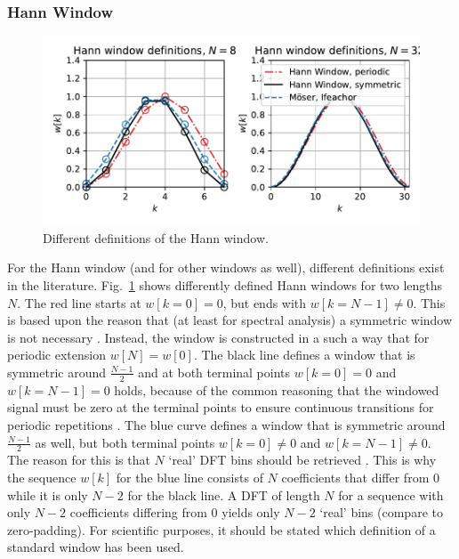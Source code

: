 \documentclass[11pt,a4paper,DIV=12]{scrartcl}
\begin{document}
\subsubsection{Hann Window}
\begin{figure}
		\centering
		\includegraphics[]{graphics/HannDefinitionen.pdf}
		\caption{Different definitions of the Hann window.}
		\label{HannDefinitionen}
\end{figure}

For the Hann window (and for other windows as well), different definitions
exist in the literature.
%
Fig.~\ref{HannDefinitionen} shows differently defined Hann windows for two
lengths $N$.
%
The red line starts at $w[k=0]=0$, but ends with $w[k=N-1]\neq0$.
%
This is based upon the reason that (at least for spectral analysis) a symmetric
window is not necessary \cite[p.~52]{Harris1978}.
%
Instead, the window is constructed in a such a way that for periodic extension
$w[N]=w[0]$.
%
The black line defines a window that is symmetric around $\frac{N-1}{2}$ and at
both terminal points $w[k=0]=0$ and $w[k=N-1]=0$ holds, because of the common
reasoning that the windowed signal must be zero at the terminal points to
ensure continuous transitions for periodic repetitions
\cite{Oppenheim2010, Lyons2011}.
%
The blue curve defines a window that is symmetric around $\frac{N-1}{2}$ as well,
but both terminal points $w[k=0]\neq0$ and $w[k=N-1]\neq0$.
%
The reason for this is that $N$ `real' DFT bins should be retrieved
\cite{Moeser2011, Ifeachor2002}.
%
This is why the sequence $w[k]$ for the blue line consists of $N$ coefficients
that differ from 0 while it is only $N-2$ for the black line.
%
A DFT of length $N$ for a sequence with only $N-2$ coefficients differing from
0 yields only $N-2$ `real' bins (compare to zero-padding).
%
For scientific purposes, it should be stated which definition of a standard
window has been used.
\end{document}
